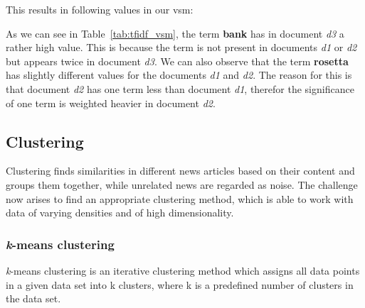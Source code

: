 This results in following values in our \Gls{vsm}:

\begin{table}[h]
    \centering
    \caption{tf-idf \Gls{vsm}.}
    \label{tab:tfidf_vsm}
\end{table}

As we can see in Table~\ref{tab:tfidf_vsm}, the term \textbf{bank} has in document \textit{d3}
a rather high value.
This is because the term is not present in documents \textit{d1} or \textit{d2} but appears
twice in document \textit{d3}.
We can also observe that the term \textbf{rosetta} has slightly different values for the
documents \textit{d1} and \textit{d2}.
The reason for this is that document \textit{d2} has one term less than document \textit{d1},
therefor the significance of one term is weighted heavier in document \textit{d2}.

\subsection{Clustering}
Clustering finds similarities in different news articles based on their content and groups them together,
while unrelated news are regarded as noise.
The challenge now arises to find an appropriate clustering method,
which is able to work with data of varying densities and of high dimensionality.


\subsubsection{\textit{k}-means clustering}
\textit{k}-means clustering is an iterative clustering method which assigns all data points in a given data set
into k clusters, where k is a predefined number of clusters in the data set.

